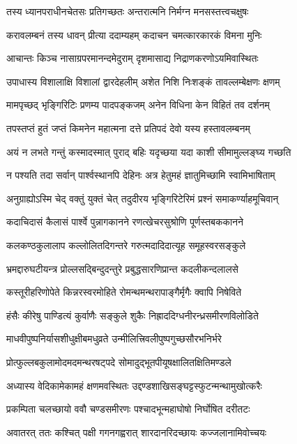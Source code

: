 \twolineshloka
{तस्य ध्यानपराधीनचेतसः प्रतिगच्छतः}
{अन्तरात्मनि निर्मग्न मनसस्तत्त्वचक्षुषः} %

\twolineshloka
{करावलम्बनं तस्य धावन् प्रीत्या ददाम्यहम्}
{कदाचन चमत्कारकारकं विमना मुनिः} %

\twolineshloka
{आचान्तः किञ्च नासाग्रपरमानन्दमेदुराम्}
{दृशमासाद्य निद्राणकरणोऽयमिवास्थितः} %

\twolineshloka
{उपाधास्य विशालाक्षि विशालां द्वारदेहलीम्}
{अशेत निशि निःशङ्कं तावल्लम्बेक्षणः क्षणम्} %

\twolineshloka
{मामपृच्छद् भृङ्गिरिटिः प्रणम्य पादपङ्कजम्}
{अनेन विधिना केन विहितं तव दर्शनम्} %

\twolineshloka
{तपस्तप्तं हुतं जप्तं किमनेन महात्मना}
{दत्ते प्रतिपदं देवो यस्य हस्तावलम्बनम्} %

\twolineshloka
{अयं न लभते गन्तुं कस्मादस्मात् पुराद् बहिः}
{यदृच्छया यदा काशी सीमामुल्लङ्घ्य गच्छति} %

\twolineshloka
{न पश्यति तदा सर्वान् पार्श्वस्थानपि देहिनः}
{अत्र हेतुमहं ज्ञातुमिच्छामि स्वामिभाषिताम्} %

\twolineshloka
{अनुग्राह्योऽस्मि चेद् वक्तुं युक्तं चेत् तदुदीरय}
{भृङ्गिरिटेरिमं प्रश्नं समाकर्ण्याहमूचिवान्} %

\twolineshloka
{कदाचिदासं कैलासं पार्श्वे पुन्नागकानने}
{रणत्खेचरसुश्रोणि पूर्णस्तबककानने} %

\twolineshloka
{कलकण्ठकुलालाप कल्लोलितदिगन्तरे}
{गरुत्मदादिदात्यूह समूहस्वरसङ्कुले} %

\twolineshloka
{भ्रमद्दारुघटीयन्त्र प्रोल्लसद्बिन्दुदन्तुरे}
{प्रबुद्धसारणिप्रान्त कदलीकन्दलालसे} %

\twolineshloka
{कस्तूरीहरिणोपेते किन्नरस्वरमोहिते}
{रोमन्थमन्थरापाङ्गैर्मृगैः क्वापि निषेविते} %

\twolineshloka
{हंसैः कीरेषु पाण्डित्यं कुर्वाणैः सङ्कुले शुकैः}
{निह्राददिग्धनीरन्ध्रसमीरणविलोडिते} %

\twolineshloka
{माधवीपुष्पनिर्यासशीधुक्षीबमधुव्रते}
{उन्मीलित्त्रिवलीपुष्पगुच्छसौरभनिर्भरे} %

\twolineshloka
{प्रोत्फुल्लबकुलामोदमदमन्थरषट्पदे}
{सोमादुद्भूतपीयूषक्षालितक्षितिमण्डले} %

\twolineshloka
{अध्यास्य वेदिकामेकामहं क्षणमवस्थितः}
{उद्दण्डशाखिसङ्घट्टस्फुटन्मन्थामुखोत्करैः} %

\twolineshloka
{प्रकम्पिता चलच्छायो ववौ चण्डसमीरणः}
{पश्चादभून्महाघोषो निर्घोषित दरीतटः} %

\twolineshloka
{अवातरत् ततः कश्चित् पक्षी गगनगह्वरात्}
{शारदानरिदच्छायः कज्जलानामिवोच्चयः} %

